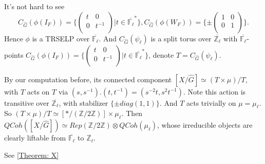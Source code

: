 \documentclass{article}
\newcommand{\red}[1]{\textcolor{red}{#1}}
\newtheorem*{remark}{Remark}
\begin{document}
	It's not hard to see 
	$$C_{\hat{G}}(\phi(I_F))=\{\begin{pmatrix} 
		t & 0 \\
		0 & t^{-1} \\
	\end{pmatrix}| t \in \overline{\mathbb{F}_{\ell}}^*\},
	C_{\hat{G}}(\phi(W_F))=\{\pm\begin{pmatrix} 
		1 & 0 \\
		0 & 1 \\
	\end{pmatrix}\}.$$
	Hence $\phi$ is a TRSELP over $\overline{\mathbb{F}_{\ell}}$. And $C_{\hat{G}}(\psi_{\ell})$ is a split torus over $\overline{\mathbb{Z}_{\ell}}$ with $\overline{\mathbb{F}_{\ell}}$-points $C_{\hat{G}}(\phi(I_F))=\{\begin{pmatrix} 
		t & 0 \\
		0 & t^{-1} \\
	\end{pmatrix}| t \in \overline{\mathbb{F}_{\ell}}^*\}$, denote $T=C_{\hat{G}}(\psi_{\ell})$.
	
	By our computation before, its connected component $[X/\hat{G}] \simeq (T \times \mu)/T$, with $T$ acts on $T$ via $(s, s^{-1}).(t, t^{-1})=(s^{-2}t, s^2t^{-1})$. Note this action is transitive over $\overline{\mathbb{Z}_{\ell}}$, with stabilizer $\{\pm{diag(1, 1)}\}$. And $T$ acts trivially on $\mu=\mu_{\ell}$. So $(T \times \mu)/T \simeq [*/(\mathbb{Z}/2\mathbb{Z})] \times \mu_{\ell}.$ Then $QCoh([X/\hat{G}]) \simeq Rep(\mathbb{Z}/2\mathbb{Z}) \otimes QCoh(\mu_{\ell})$, whose irreducible objects are clearly liftable from $\overline{\mathbb{F}_{\ell}}$ to $\overline{\mathbb{Z}_{\ell}}$.
	
	See \ref{Theorem: X}
	
\end{document}
